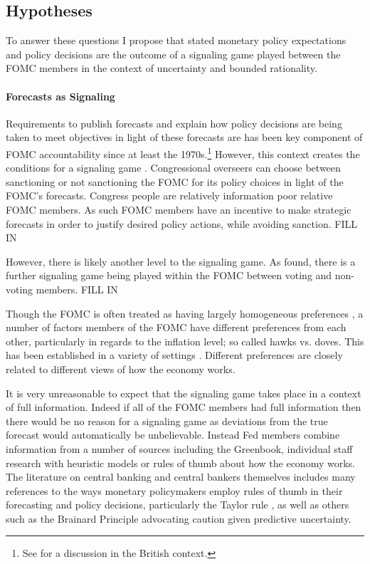 \documentclass[a4paper]{article}\usepackage[]{graphicx}\usepackage[]{color}
\begin{document}
\subsection{Hypotheses}

To answer these questions I propose that stated monetary policy expectations and policy decisions are the outcome of a signaling game played between the FOMC members in the context of uncertainty and bounded rationality. 

\paragraph{Forecasts as Signaling}

Requirements to publish forecasts and explain how policy decisions are being taken to meet objectives in light of these forecasts are has been key component of FOMC accountability since at least the 1970s.\footnote{See \cite{Goodhart2001} for a discussion in the British context.} However, this context creates the conditions for a signaling game \cite[see][]{Crawford1982,Gibbons1992}. Congressional overseers can choose between sanctioning or not sanctioning the FOMC for its policy choices in light of the FOMC's forecasts. Congress people are relatively information poor relative FOMC members. As such FOMC members have an incentive to make strategic forecasts in order to justify desired policy actions, while avoiding sanction. FILL IN

However, there is likely another level to the signaling game. As \cite{Rulke2011} found, there is a further signaling game being played within the FOMC between voting and non-voting members. FILL IN

Though the FOMC is often treated as having largely homogeneous preferences \cite[for example][]{Clark2013}, a number of factors members of the FOMC have different preferences from each other, particularly in regards to the inflation level; so called hawks vs. doves. This has been established in a variety of settings \cite[see][]{Hix2010}. Different preferences are closely related to different views of how the economy works. 

It is very unreasonable to expect that the signaling game takes place in a context of full information. Indeed if all of the FOMC members had full information then there would be no reason for a signaling game as deviations from the true forecast would automatically be unbelievable. Instead Fed members combine information from a number of sources including the Greenbook, individual staff research with heuristic models or rules of thumb about how the economy works. The literature on central banking and central bankers themselves includes many references to the ways monetary policymakers employ rules of thumb in their forecasting and policy decisions, particularly the Taylor rule \cite[for example][]{Svensson2003,Orphanides2008,Leitemo2005}, as well as others such as the Brainard Principle \citep{Brainard1967} advocating caution given predictive uncertainty. 
\end{document}
